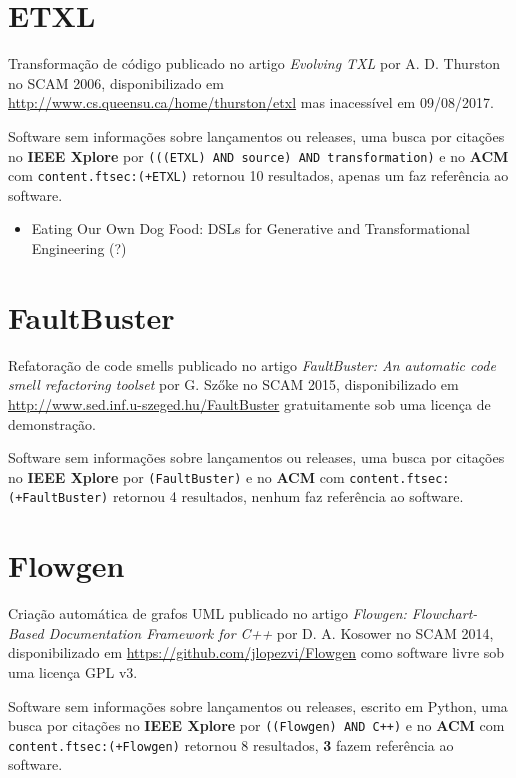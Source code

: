 \section{ETXL}

Transformação de código
publicado no artigo {\it Evolving TXL}
por A. D. Thurston
no SCAM 2006,
disponibilizado em \url{http://www.cs.queensu.ca/home/thurston/etxl}
mas inacessível em 09/08/2017.

Software sem informações sobre lançamentos ou releases,
uma busca por citações no {\bf IEEE Xplore} por
\texttt{(((ETXL) AND source) AND transformation)}
e no {\bf ACM} com
\texttt{content.ftsec:(+ETXL)}
retornou
10 resultados,
apenas um faz referência ao software.

\begin{itemize}
\item Eating Our Own Dog Food: DSLs for Generative and Transformational Engineering (?)
\end{itemize}

\section{FaultBuster}

Refatoração de code smells
publicado no artigo {\it FaultBuster: An automatic code smell refactoring toolset}
por G. Szőke
no SCAM 2015,
disponibilizado em \url{http://www.sed.inf.u-szeged.hu/FaultBuster}
gratuitamente
sob uma licença de demonstração.

Software sem informações sobre lançamentos ou releases,
uma busca por citações no {\bf IEEE Xplore} por
\texttt{(FaultBuster)}
e no {\bf ACM} com
\texttt{content.ftsec:(+FaultBuster)}
retornou
4 resultados,
nenhum faz referência ao software.


\section{Flowgen}

Criação automática de grafos UML
publicado no artigo {\it Flowgen: Flowchart-Based Documentation Framework for C++}
por D. A. Kosower
no SCAM 2014,
disponibilizado em \url{https://github.com/jlopezvi/Flowgen}
como software livre
sob uma licença GPL v3.

Software sem informações sobre lançamentos ou releases,
escrito em Python,
uma busca por citações no {\bf IEEE Xplore} por
\texttt{((Flowgen) AND C++)}
e no {\bf ACM} com
\texttt{content.ftsec:(+Flowgen)}
retornou
8 resultados,
{\bf 3} fazem referência ao software.

